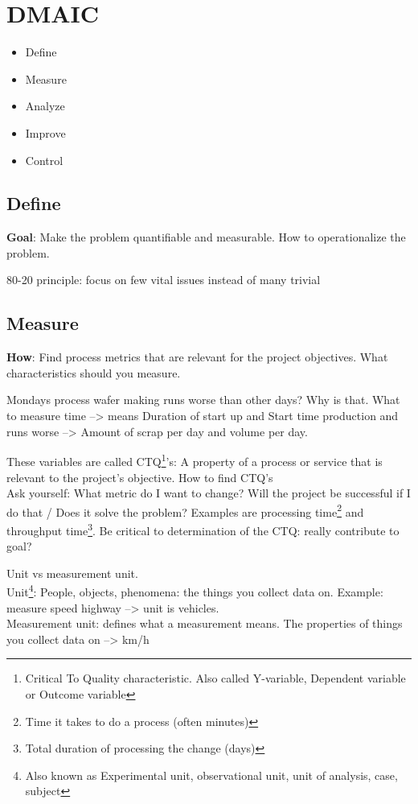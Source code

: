 \documentclass{notes}
\begin{document}
\section{DMAIC}
\begin{itemize}[noitemsep]
    \setlength{\itemsep}{0pt}
    \item Define
    \item Measure
    \item Analyze
    \item Improve
    \item Control
\end{itemize}
\subsection{Define}
\textbf{Goal}: Make the problem quantifiable and measurable. How to operationalize the problem. 

80-20 principle: focus on few vital issues instead of many trivial
\subsection{Measure}
\textbf{How}: Find process metrics that are relevant for the project objectives. What characteristics should you measure.
\begin{example}
Mondays process wafer making runs worse than other days? Why is that. What to measure time --> means Duration of start up and Start time production and runs worse --> Amount of scrap per day and volume per day.
\end{example}
These variables are called CTQ\footnote{Critical To Quality characteristic. Also called Y-variable, Dependent variable or Outcome variable}'s: A property of a process or service that is relevant to the project's objective. How to find CTQ's\\
Ask yourself: What metric do I want to change? Will the project be successful if I do that / Does it solve the problem? Examples are processing time\footnote{Time it takes to do a process (often minutes)} and throughput time\footnote{Total duration of processing the change (days)}. Be critical to determination of the CTQ: really contribute to goal?

Unit vs measurement unit.\\
Unit\footnote{Also known as Experimental unit, observational unit, unit of analysis, case, subject}: People, objects, phenomena: the things you collect data on. Example: measure speed highway --> unit is vehicles.\\ 
Measurement unit: defines what a measurement means. The properties of things you collect data on --> km/h
\end{document}
